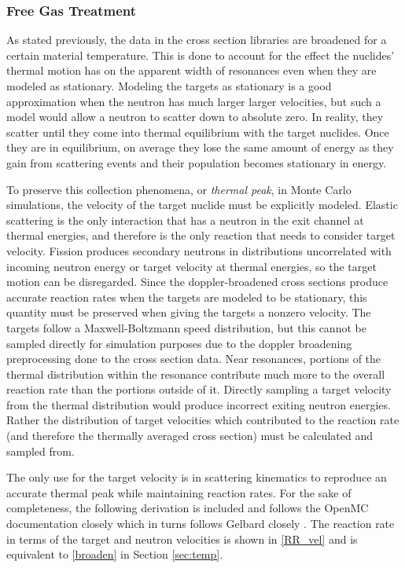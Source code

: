 \subsubsection{Free Gas Treatment}

As stated previously, the data in the cross section libraries are broadened for a certain material temperature.  This is done to account for the effect the nuclides' thermal motion has on the apparent width of resonances even when they are modeled as stationary.  Modeling the targets as stationary is a good approximation when the neutron has much larger larger velocities, but such a model would allow a neutron to scatter down to absolute zero.  In reality, they scatter until they come into thermal equilibrium with the target nuclides.  Once they are in equilibrium, on average they lose the same amount of energy as they gain from scattering events and their population becomes stationary in energy.  

To preserve this collection phenomena, or \emph{thermal peak}, in Monte Carlo simulations, the velocity of the target nuclide must be explicitly modeled.  Elastic scattering is the only interaction that has a neutron in the exit channel at thermal energies, and therefore is the only reaction that needs to consider target velocity.  Fission produces secondary neutrons in distributions uncorrelated with incoming neutron energy or target velocity at thermal energies, so the target motion can be disregarded.  Since the doppler-broadened cross sections produce accurate reaction rates when the targets are modeled to be stationary, this quantity must be preserved when giving the targets a nonzero velocity.  The targets follow a Maxwell-Boltzmann speed distribution, but this cannot be sampled directly for simulation purposes due to the doppler broadening preprocessing done to the cross section data.  Near resonances, portions of the thermal distribution within the resonance contribute much more to the overall reaction rate than the portions outside of it.  Directly sampling a target velocity from the thermal distribution would produce incorrect exiting neutron energies.  Rather the distribution of target velocities which contributed to the reaction rate (and therefore the thermally averaged cross section) must be calculated and sampled from.

The only use for the target velocity is in scattering kinematics to reproduce an accurate thermal peak while maintaining reaction rates.  For the sake of completeness, the following derivation is included and follows the OpenMC documentation closely which in turns follows Gelbard closely \cite{openmc}\cite{gelbard}.  The reaction rate in terms of the target and neutron velocities is shown in \eqref{RR_vel} and is equivalent to \eqref{broaden} in Section \ref{sec:temp}.

